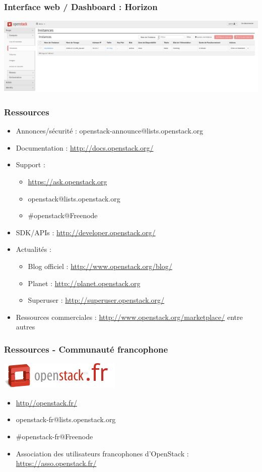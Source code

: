   \begin{frame}
    \frametitle{Interface web / Dashboard : Horizon}
    \includegraphics[width=\textwidth]{images/horizon.png}
  \end{frame}

  \begin{frame}
    \frametitle{Ressources}
    \begin{itemize}
      \item Annonces/sécurité : openstack-announce@lists.openstack.org
      \item Documentation : \url{http://docs.openstack.org/}
      \item Support :
      \begin{itemize}
        \item \url{https://ask.openstack.org}
        \item openstack@lists.openstack.org
        \item \#openstack@Freenode
      \end{itemize}
      \item SDK/APIs : \url{http://developer.openstack.org/}
      \item Actualités :
      \begin{itemize}
        \item Blog officiel : \url{http://www.openstack.org/blog/}
        \item Planet : \url{http://planet.openstack.org}
        \item Superuser : \url{http://superuser.openstack.org/}
      \end{itemize}
    \item Ressources commerciales : \url{http://www.openstack.org/marketplace/} entre autres
    \end{itemize}
  \end{frame}

  \begin{frame}
    \frametitle{Ressources - Communauté francophone}
    \includegraphics{images/openstackfr.png}
    \begin{itemize}
      \item \url{http//openstack.fr/}
      \item openstack-fr@lists.openstack.org
      \item \#openstack-fr@Freenode
      \item Association des utilisateurs francophones d'OpenStack : \url{https://asso.openstack.fr/}
    \end{itemize}
  \end{frame}

